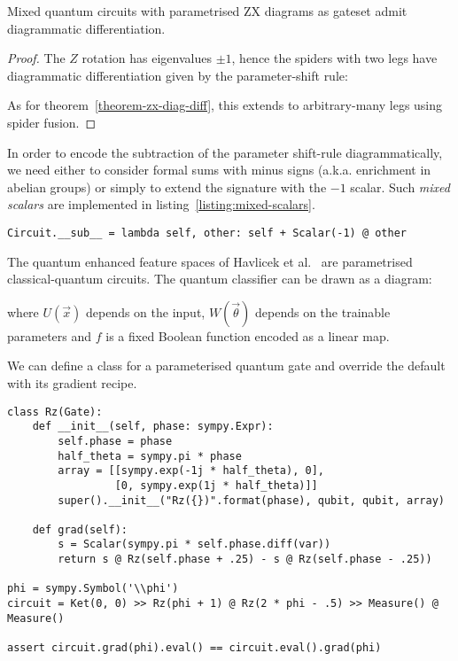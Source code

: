 \begin{corollary}
Mixed quantum circuits with parametrised ZX diagrams as gateset admit diagrammatic differentiation.
\end{corollary}

\begin{proof}
The $Z$ rotation has eigenvalues $\pm 1$, hence the spiders with two legs have
diagrammatic differentiation given by the parameter-shift rule:


As for theorem~\ref{theorem-zx-diag-diff}, this extends to
arbitrary-many legs using spider fusion.
\end{proof}

\begin{remark}
In order to encode the subtraction of the parameter shift-rule diagrammatically, we
need either to consider formal sums with minus signs (a.k.a. enrichment in
abelian groups) or simply to extend the signature with the $-1$ scalar.
Such \emph{mixed scalars} are implemented in listing~\ref{listing:mixed-scalars}.

\begin{verbatim}
Circuit.__sub__ = lambda self, other: self + Scalar(-1) @ other
\end{verbatim}
\end{remark}

\begin{example}
The quantum enhanced feature spaces of Havlicek et al.~\cite{HavlicekEtAl19} are parametrised
classical-quantum circuits.
The quantum classifier can be drawn as a diagram:


where $U(\vec{x})$ depends on the input, $W(\vec{\theta})$ depends on the
trainable parameters and $f$ is a fixed Boolean function encoded as a linear map.
\end{example}

\begin{example}
We can define a class for a parameterised quantum gate and override the default  with its gradient recipe.

\begin{verbatim}
class Rz(Gate):
    def __init__(self, phase: sympy.Expr):
        self.phase = phase
        half_theta = sympy.pi * phase
        array = [[sympy.exp(-1j * half_theta), 0],
                 [0, sympy.exp(1j * half_theta)]]
        super().__init__("Rz({})".format(phase), qubit, qubit, array)

    def grad(self):
        s = Scalar(sympy.pi * self.phase.diff(var))
        return s @ Rz(self.phase + .25) - s @ Rz(self.phase - .25))

phi = sympy.Symbol('\\phi')
circuit = Ket(0, 0) >> Rz(phi + 1) @ Rz(2 * phi - .5) >> Measure() @ Measure()

assert circuit.grad(phi).eval() == circuit.eval().grad(phi)
\end{verbatim}
\end{example}
